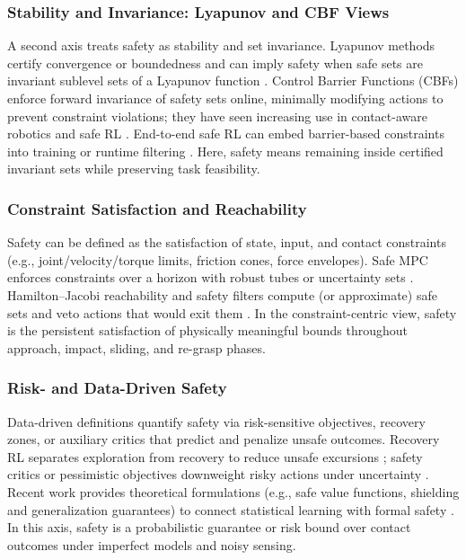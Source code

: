 \documentclass[Afour,sageh,times]{template/sagej}
\begin{document}
\subsubsection{Stability and Invariance: Lyapunov and CBF Views}
A second axis treats safety as stability and set invariance. Lyapunov methods certify convergence or boundedness and can imply safety when safe sets are invariant sublevel sets of a Lyapunov function \citep{khalil2002nonlinear, kumar_safe_2025}. Control Barrier Functions (CBFs) enforce forward invariance of safety sets online, minimally modifying actions to prevent constraint violations; they have seen increasing use in contact-aware robotics and safe RL \citep{ames2019cbf,guerrier2024learning,213,235}. End-to-end safe RL can embed barrier-based constraints into training or runtime filtering \citep{287,129}. Here, safety means remaining inside certified invariant sets while preserving task feasibility.

\subsubsection{Constraint Satisfaction and Reachability}
Safety can be defined as the satisfaction of state, input, and contact constraints (e.g., joint/velocity/torque limits, friction cones, force envelopes). Safe MPC enforces constraints over a horizon with robust tubes or uncertainty sets \citep{hewing2020learning,21}. Hamilton–Jacobi reachability and safety filters compute (or approximate) safe sets and veto actions that would exit them \citep{bansal2017hamilton,wabersich2023data,271}. In the constraint-centric view, safety is the persistent satisfaction of physically meaningful bounds throughout approach, impact, sliding, and re-grasp phases.

\subsubsection{Risk- and Data-Driven Safety}
Data-driven definitions quantify safety via risk-sensitive objectives, recovery zones, or auxiliary critics that predict and penalize unsafe outcomes. Recovery RL separates exploration from recovery to reduce unsafe excursions \citep{91}; safety critics or pessimistic objectives downweight risky actions under uncertainty \citep{185,gu2024review,brunke2022safe}. Recent work provides theoretical formulations (e.g., safe value functions, shielding and generalization guarantees) to connect statistical learning with formal safety \citep{165,137}. In this axis, safety is a probabilistic guarantee or risk bound over contact outcomes under imperfect models and noisy sensing.
\end{document}
